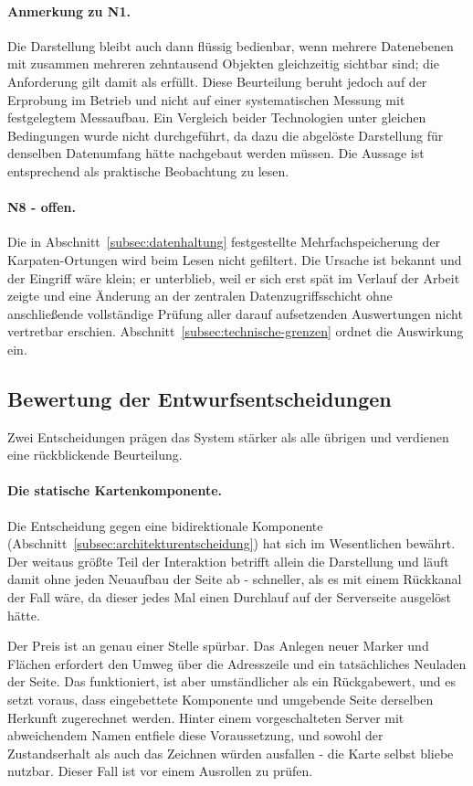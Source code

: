 \documentclass[12pt,a4paper]{report}
\begin{document}
\paragraph{Anmerkung zu N1.} Die Darstellung bleibt auch dann flüssig bedienbar, wenn
mehrere Datenebenen mit zusammen mehreren zehntausend Objekten gleichzeitig sichtbar sind;
die Anforderung gilt damit als erfüllt. Diese Beurteilung beruht jedoch auf der Erprobung im
Betrieb und nicht auf einer systematischen Messung mit festgelegtem Messaufbau. Ein Vergleich
beider Technologien unter gleichen Bedingungen wurde nicht durchgeführt, da dazu die
abgelöste Darstellung für denselben Datenumfang hätte nachgebaut werden müssen. Die Aussage
ist entsprechend als praktische Beobachtung zu lesen.

\paragraph{N8 - offen.} Die in Abschnitt~\ref{subsec:datenhaltung} festgestellte
Mehrfachspeicherung der Karpaten-Ortungen wird beim Lesen nicht gefiltert. Die Ursache ist
bekannt und der Eingriff wäre klein; er unterblieb, weil er sich erst spät im Verlauf der
Arbeit zeigte und eine Änderung an der zentralen Datenzugriffsschicht ohne anschließende
vollständige Prüfung aller darauf aufsetzenden Auswertungen nicht vertretbar erschien.
Abschnitt~\ref{subsec:technische-grenzen} ordnet die Auswirkung ein.

\subsection{Bewertung der Entwurfsentscheidungen}
\label{subsec:bewertung-entwurf}

Zwei Entscheidungen prägen das System stärker als alle übrigen und verdienen eine
rückblickende Beurteilung.

\paragraph{Die statische Kartenkomponente.} Die Entscheidung gegen eine bidirektionale
Komponente (Abschnitt~\ref{subsec:architekturentscheidung}) hat sich im Wesentlichen
bewährt. Der weitaus größte Teil der Interaktion betrifft allein die Darstellung und läuft
damit ohne jeden Neuaufbau der Seite ab - schneller, als es mit einem Rückkanal der Fall
wäre, da dieser jedes Mal einen Durchlauf auf der Serverseite ausgelöst hätte.

Der Preis ist an genau einer Stelle spürbar. Das Anlegen neuer Marker und Flächen erfordert
den Umweg über die Adresszeile und ein tatsächliches Neuladen der Seite. Das funktioniert,
ist aber umständlicher als ein Rückgabewert, und es setzt voraus, dass eingebettete
Komponente und umgebende Seite derselben Herkunft zugerechnet werden. Hinter einem
vorgeschalteten Server mit abweichendem Namen entfiele diese Voraussetzung, und sowohl der
Zustandserhalt als auch das Zeichnen würden ausfallen - die Karte selbst bliebe nutzbar.
Dieser Fall ist vor einem Ausrollen zu prüfen.
\end{document}

